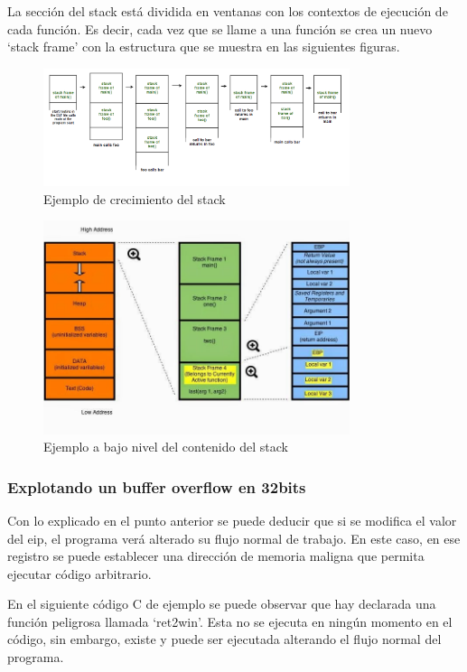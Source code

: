 La sección del stack está dividida en ventanas con los contextos de ejecución de cada función. Es decir, cada vez que se llame a una función se crea un nuevo `stack frame' con la estructura que se muestra en las siguientes figuras.

\begin{figure}[htb!]
    \centering                        
    \includegraphics[width=0.8\textwidth]{images/stack-funcs.png}
    \caption{Ejemplo de crecimiento del stack}
    \label{fig:stack-funcs}
\end{figure}
\FloatBarrier
\begin{figure}[htb!]
    \centering                        
    \includegraphics[width=0.8\textwidth]{images/stack-arch.jpg}
    \caption{Ejemplo a bajo nivel del contenido del stack }
    \label{fig:stack-arch}
\end{figure}
\FloatBarrier
\subsubsection{Explotando un buffer overflow en 32bits} \label{subsub:bof}
Con lo explicado en el punto anterior se puede deducir que si se modifica el valor del \acrshort{eip}, el programa verá alterado su flujo normal de trabajo.
En este caso, en ese registro se puede establecer una dirección de memoria maligna que permita ejecutar código arbitrario.

En el siguiente código C de ejemplo se puede observar que hay declarada una función peligrosa llamada `ret2win'.
Esta no se ejecuta en ningún momento en el código, sin embargo, existe y puede ser ejecutada alterando el flujo normal del programa.

